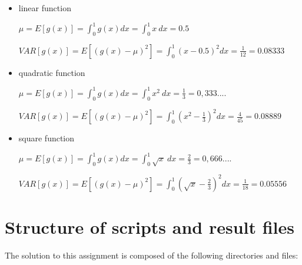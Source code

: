 \documentclass[paper=a4, fontsize=11pt]{scrartcl} %
\numberwithin{equation}{section} %
\numberwithin{figure}{section} %
\numberwithin{table}{section} %
\begin{document}
\begin{itemize}
\item linear function

\begin{center}
$\mu = E[g(x)] = \int_{0}^{1}g(x) dx = \int_{0}^{1}x \ dx = 0.5$
\end{center}

\begin{center}
$VAR[g(x)] = E[(g(x)-\mu)^{2}] = \int_{0}^{1}(x-0.5)^{2}dx = \frac{1}{12} = 0.08333$
\end{center}

\item quadratic function

\begin{center}
$\mu = E[g(x)] = \int_{0}^{1}g(x) dx = \int_{0}^{1}x^{2} \ dx = \frac{1}{3} = 0,333....$
\end{center}

\begin{center}
$VAR[g(x)] = E[(g(x)-\mu)^{2}] = \int_{0}^{1}(x^{2}-\frac{1}{3})^{2}dx = \frac{4}{45} = 0.08889$
\end{center}

\item square function

\begin{center}
$\mu = E[g(x)] = \int_{0}^{1}g(x) dx = \int_{0}^{1}\sqrt{x} \ dx  = \frac{2}{3} = 0,666....$
\end{center}

\begin{center}
$VAR[g(x)] = E[(g(x)-\mu)^{2}] = \int_{0}^{1}(\sqrt{x}-\frac{2}{3})^{2}dx = \frac{1}{18} = 0.05556$
\end{center}

\end{itemize}


\section{Structure of scripts and result files}


The solution to this assignment is composed of the following directories and files:
\end{document}
